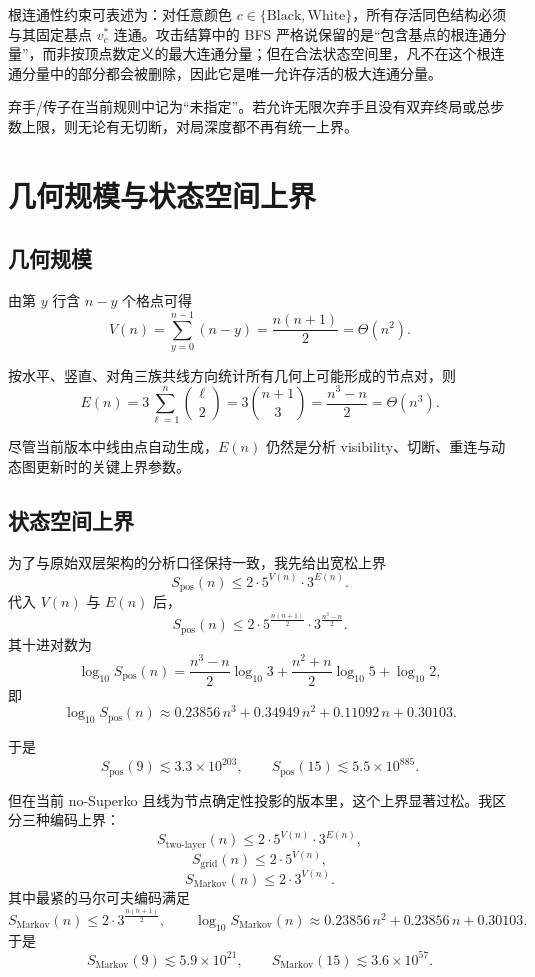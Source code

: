 \documentclass[12pt]{ctexart}
\begin{document}
根连通性约束可表述为：对任意颜色 \(c\in\{\mathrm{Black},\mathrm{White}\}\)，所有存活同色结构必须与其固定基点 \(v_c^\ast\) 连通。攻击结算中的 BFS 严格说保留的是“包含基点的根连通分量”，而非按顶点数定义的最大连通分量；但在合法状态空间里，凡不在这个根连通分量中的部分都会被删除，因此它是唯一允许存活的极大连通分量。

弃手/传子在当前规则中记为“未指定”。若允许无限次弃手且没有双弃终局或总步数上限，则无论有无切断，对局深度都不再有统一上界。

\section*{几何规模与状态空间上界}

\subsection*{几何规模}

由第 \(y\) 行含 \(n-y\) 个格点可得
\[
V(n)=\sum_{y=0}^{n-1}(n-y)=\frac{n(n+1)}2=\Theta(n^2).
\]

按水平、竖直、对角三族共线方向统计所有几何上可能形成的节点对，则
\[
E(n)
=
3\sum_{\ell=1}^{n}\binom{\ell}{2}
=
3\binom{n+1}{3}
=
\frac{n^3-n}{2}
=
\Theta(n^3).
\]

尽管当前版本中线由点自动生成，\(E(n)\) 仍然是分析 visibility、切断、重连与动态图更新时的关键上界参数。

\subsection*{状态空间上界}

为了与原始双层架构的分析口径保持一致，我先给出宽松上界
\[
S_{\mathrm{pos}}(n)\le 2\cdot 5^{V(n)}\cdot 3^{E(n)}.
\]
代入 \(V(n)\) 与 \(E(n)\) 后，
\[
S_{\mathrm{pos}}(n)\le
2\cdot 5^{\frac{n(n+1)}2}\cdot 3^{\frac{n^3-n}{2}}.
\]
其十进对数为
\[
\log_{10} S_{\mathrm{pos}}(n)
=
\frac{n^3-n}{2}\log_{10}3
+\frac{n^2+n}{2}\log_{10}5
+\log_{10}2,
\]
即
\[
\log_{10} S_{\mathrm{pos}}(n)
\approx
0.23856\,n^3+0.34949\,n^2+0.11092\,n+0.30103.
\]

于是
\[
S_{\mathrm{pos}}(9)\lesssim 3.3\times 10^{203},
\qquad
S_{\mathrm{pos}}(15)\lesssim 5.5\times 10^{885}.
\]

但在当前 no-Superko 且线为节点确定性投影的版本里，这个上界显著过松。我区分三种编码上界：
\[
S_{\mathrm{two\text{-}layer}}(n)\le 2\cdot 5^{V(n)}\cdot 3^{E(n)},
\]
\[
S_{\mathrm{grid}}(n)\le 2\cdot 5^{V(n)},
\]
\[
S_{\mathrm{Markov}}(n)\le 2\cdot 3^{V(n)}.
\]
其中最紧的马尔可夫编码满足
\[
S_{\mathrm{Markov}}(n)\le 2\cdot 3^{\frac{n(n+1)}2},
\qquad
\log_{10}S_{\mathrm{Markov}}(n)\approx 0.23856\,n^2+0.23856\,n+0.30103.
\]
于是
\[
S_{\mathrm{Markov}}(9)\lesssim 5.9\times 10^{21},
\qquad
S_{\mathrm{Markov}}(15)\lesssim 3.6\times 10^{57}.
\]
\end{document}

